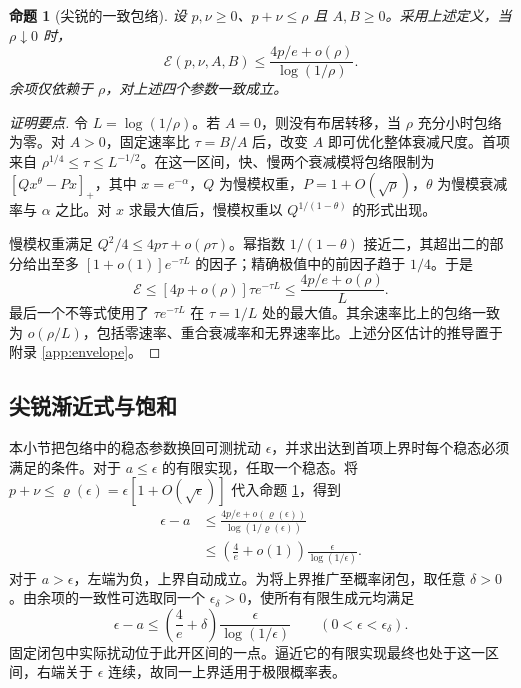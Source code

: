 \documentclass[aps,pra,reprint,amsmath,amssymb,nofootinbib,floatfix,longbibliography]{revtex4-2}
\theoremstyle{aps}
\newtheorem{proposition}[theorem]{命题}
\newcommand{\eps}{\epsilon}
\begin{document}
\begin{proposition}[尖锐的一致包络]\label{prop:envelope}
设 $p,\nu\ge0$、$p+\nu\le\rho$ 且 $A,B\ge0$。采用上述定义，当 $\rho\downarrow0$ 时，
\begin{equation}\label{eq:refined}
 \mathcal E(p,\nu,A,B)
 \le\frac{4p/e+o(\rho)}{\log(1/\rho)}.
\end{equation}
余项仅依赖于 $\rho$，对上述四个参数一致成立。
\end{proposition}
\begin{proof}[证明要点]
令 $L=\log(1/\rho)$。若 $A=0$，则没有布居转移，当 $\rho$ 充分小时包络为零。对 $A>0$，固定速率比 $\tau=B/A$ 后，改变 $A$ 即可优化整体衰减尺度。首项来自 $\rho^{1/4}\le\tau\le L^{-1/2}$。在这一区间，快、慢两个衰减模将包络限制为 $[Qx^\theta-Px]_+$，其中 $x=e^{-\alpha}$，$Q$ 为慢模权重，$P=1+O(\sqrt\rho)$，$\theta$ 为慢模衰减率与 $\alpha$ 之比。对 $x$ 求最大值后，慢模权重以 $Q^{1/(1-\theta)}$ 的形式出现。

慢模权重满足 $Q^2/4\le 4p\tau+o(\rho\tau)$。幂指数 $1/(1-\theta)$ 接近二，其超出二的部分给出至多 $[1+o(1)]e^{-\tau L}$ 的因子；精确极值中的前因子趋于 $1/4$。于是
\begin{equation}\label{eq:leading-core}
 \mathcal E\le[4p+o(\rho)]\tau e^{-\tau L}
 \le\frac{4p/e+o(\rho)}L.
\end{equation}
最后一个不等式使用了 $\tau e^{-\tau L}$ 在 $\tau=1/L$ 处的最大值。其余速率比上的包络一致为 $o(\rho/L)$，包括零速率、重合衰减率和无界速率比。上述分区估计的推导置于附录 \ref{app:envelope}。
\end{proof}

\subsection{尖锐渐近式与饱和}

本小节把包络中的稳态参数换回可测扰动 $\eps$，并求出达到首项上界时每个稳态必须满足的条件。对于 $a\le\eps$ 的有限实现，任取一个稳态。将 $p+\nu\le\varrho(\eps)=\eps[1+O(\sqrt\eps)]$ 代入命题 \ref{prop:envelope}，得到
\begin{equation}\label{eq:physicalupper}
 \begin{aligned}
 \eps-a&\le\frac{4p/e+o(\varrho(\eps))}{\log(1/\varrho(\eps))}\\
 &\le\left(\frac4e+o(1)\right)\frac\eps{\log(1/\eps)} .
 \end{aligned}
\end{equation}
对于 $a>\eps$，左端为负，上界自动成立。为将上界推广至概率闭包，取任意 $\delta>0$。由余项的一致性可选取同一个 $\eps_\delta>0$，使所有有限生成元均满足
\begin{equation}\label{eq:finiteuniform}
 \eps-a\le\left(\frac4e+\delta\right)
 \frac\eps{\log(1/\eps)}\qquad(0<\eps<\eps_\delta).
\end{equation}
固定闭包中实际扰动位于此开区间的一点。逼近它的有限实现最终也处于这一区间，右端关于 $\eps$ 连续，故同一上界适用于极限概率表。
\end{document}
